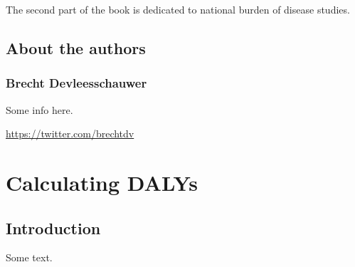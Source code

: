 \documentclass[]{book}
\begin{document}
The second part of the book is dedicated to national burden of disease
studies.

\chapter*{About the authors}\label{about-the-authors}

\section*{Brecht Devleesschauwer}\label{brecht-devleesschauwer}

Some info here.

\url{https://twitter.com/brechtdv}

\part{Calculating DALYs}\label{part-calculating-dalys}

\chapter{Introduction}\label{introduction}

Some text.


\end{document}
